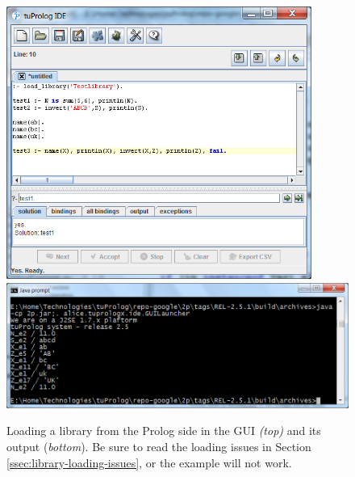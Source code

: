 \begin{figure}
    \centering
  \includegraphics[width=10cm]{images/TestLibrary3}
  \includegraphics[width=12cm]{images/TestLibrary4}
  \caption{Loading a library from the Prolog side in the GUI \textit{(top)} and its output (\textit{bottom}). Be sure to read the loading issues in Section \ref{ssec:library-loading-issues}, or the example will not work.}
  \label{fig:testlibrary3}
\end{figure}
%
